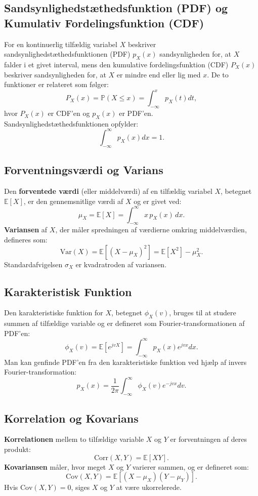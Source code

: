 \documentclass[a4paper,12pt]{book}
\begin{document}
	\subsection{Sandsynlighedstæthedsfunktion (PDF) og Kumulativ Fordelingsfunktion (CDF)}
	For en kontinuerlig tilfældig variabel \( X \) beskriver sandsynlighedstæthedsfunktionen (PDF) \( p_X(x) \) sandsynligheden for, at \( X \) falder i et givet interval, mens den kumulative fordelingsfunktion (CDF) \( P_X(x) \) beskriver sandsynligheden for, at \( X \) er mindre end eller lig med \( x \). De to funktioner er relateret som følger:
	\[
	P_X(x) = \mathbb{P}(X \leq x) = \int_{-\infty}^{x} p_X(t) dt,
	\]
	hvor \( P_X(x) \) er CDF'en og \( p_X(x) \) er PDF'en. Sandsynlighedstæthedsfunktionen opfylder:
	\[
	\int_{-\infty}^{\infty} p_X(x) dx = 1.
	\]
	
	\subsection{Forventningsværdi og Varians}
	Den \textbf{forventede værdi} (eller middelværdi) af en tilfældig variabel \( X \), betegnet \( \mathbb{E}[X] \), er den gennemsnitlige værdi af \( X \) og er givet ved:
	\[
	\mu_X = \mathbb{E}[X] = \int_{-\infty}^{\infty} x \, p_X(x) \, dx.
	\]
	\textbf{Variansen} af \( X \), der måler spredningen af værdierne omkring middelværdien, defineres som:
	\[
	\text{Var}(X) = \mathbb{E}[(X - \mu_X)^2] = \mathbb{E}[X^2] - \mu_X^2.
	\]
	Standardafvigelsen \( \sigma_X \) er kvadratroden af variansen.
	
	\subsection{Karakteristisk Funktion}
	Den karakteristiske funktion for \( X \), betegnet \( \phi_X(v) \), bruges til at studere summen af tilfældige variable og er defineret som Fourier-transformationen af PDF'en:
	\[
	\phi_X(v) = \mathbb{E}[e^{jvX}] = \int_{-\infty}^{\infty} p_X(x) e^{jvx} dx.
	\]
	Man kan genfinde PDF'en fra den karakteristiske funktion ved hjælp af invers Fourier-transformation:
	\[
	p_X(x) = \frac{1}{2\pi} \int_{-\infty}^{\infty} \phi_X(v) e^{-jvx} dv.
	\]
	
	\subsection{Korrelation og Kovarians}
	\textbf{Korrelationen} mellem to tilfældige variable \( X \) og \( Y \) er forventningen af deres produkt:
	\[
	\text{Corr}(X, Y) = \mathbb{E}[XY].
	\]
	\textbf{Kovariansen} måler, hvor meget \( X \) og \( Y \) varierer sammen, og er defineret som:
	\[
	\text{Cov}(X, Y) = \mathbb{E}[(X - \mu_X)(Y - \mu_Y)].
	\]
	Hvis \( \text{Cov}(X, Y) = 0 \), siges \( X \) og \( Y \) at være ukorrelerede.
	
\end{document}
